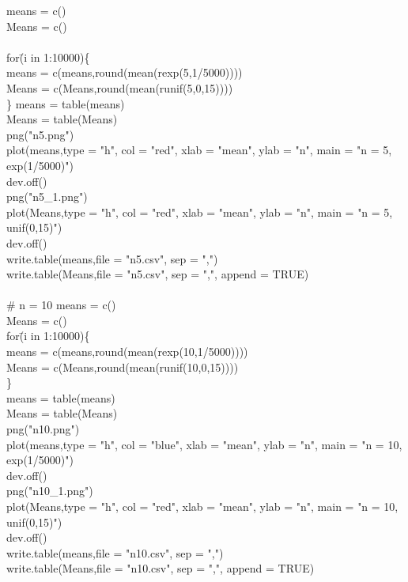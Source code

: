 \documentclass{article}
\begin{document}
{\selectfont
\begin{tabbing}
means = c() \\
Means = c() \\
\\
for\=(i in 1:10000)\{ \+ \\
	means = c(means,round(mean(rexp(5,1/5000)))) \\
	Means = c(Means,round(mean(runif(5,0,15)))) \\
\} \-
means = table(means) \\
Means = table(Means) \\
png("n5.png") \\
plot(means,type = "h", col = "red", xlab = "mean", ylab = "n", main = "n = 5, exp(1/5000)") \\
dev.off() \\
png("n5\_1.png") \\
plot(Means,type = "h", col = "red", xlab = "mean", ylab = "n", main = "n = 5, unif(0,15)") \\
dev.off() \\
write.table(means,file = "n5.csv", sep = ",") \\
write.table(Means,file = "n5.csv", sep = ",", append = TRUE) \\
\\
\# n = 10
means = c() \\
Means = c() \\
for\=(i in 1:10000)\{ \+ \\
	means = c(means,round(mean(rexp(10,1/5000)))) \\
	Means = c(Means,round(mean(runif(10,0,15)))) \\
\} \- \\
means = table(means) \\
Means = table(Means) \\
png("n10.png") \\
plot(means,type = "h", col = "blue", xlab = "mean", ylab = "n", main = "n = 10, exp(1/5000)") \\
dev.off() \\
png("n10\_1.png") \\
plot(Means,type = "h", col = "red", xlab = "mean", ylab = "n", main = "n = 10, unif(0,15)") \\
dev.off() \\
write.table(means,file = "n10.csv", sep = ",") \\
write.table(Means,file = "n10.csv", sep = ",", append = TRUE) \\
\\

\end{tabbing}}
\end{document}
